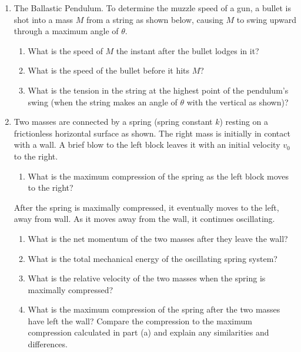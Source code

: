 \documentclass{../../oss-apphys}
\begin{document}
\begin{enumerate}[leftmargin=15pt]
\item The Ballastic Pendulum. To determine the muzzle speed of a gun, a bullet
  is shot into a mass $M$ from a string as shown below, causing $M$ to swing
  upward through a maximum angle of $\theta$.
  \begin{center}
  \end{center}
  \begin{enumerate}[noitemsep]
  \item What is the speed of $M$ the instant after the bullet lodges in it?
    \vspace{1.25in}
  \item What is the speed of the bullet before it hits $M$?
    \vspace{1.25in}
  \item What is the tension in the string at the highest point of the pendulum's
    swing (when the string makes an angle of $\theta$ with the vertical as
    shown)?
  \end{enumerate}
  \newpage
\item Two masses are connected by a spring (spring constant $k$) resting on a
  frictionless horizontal surface as shown. The right mass is initially in
  contact with a wall. A brief blow to the left block leaves it with an initial
  velocity $v_0$ to the right.
  \begin{enumerate}[leftmargin=18pt]
  \item What is the maximum compression of the spring as the left block moves
    to the right?
    \vspace{1in}
  \end{enumerate}
  After the spring is maximally compressed, it eventually moves to the left,
  away from wall. As it moves away from the wall, it continues oscillating.
  \begin{center}
  \end{center}
  \begin{enumerate}[leftmargin=18pt,resume]
  \item What is the net momentum of the two masses after they leave the wall?
    \vspace{1in}
  \item What is the total mechanical energy of the oscillating spring system?
    \vspace{1in}
  \item What is the relative velocity of the two masses when the spring is
    maximally compressed?
    \vspace{1in}
  \item What is the maximum compression of the spring after the two masses have
    left the wall? Compare the compression to the maximum compression calculated
    in part (a) and explain any similarities and differences.
  \end{enumerate}




\end{enumerate}
\end{document}
